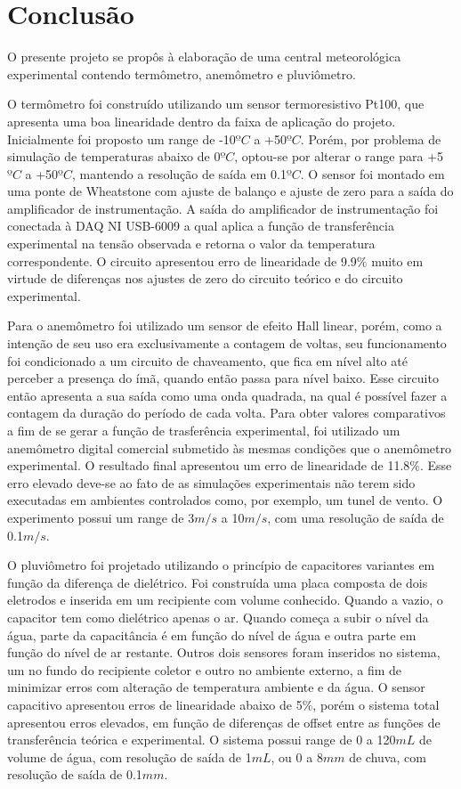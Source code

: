 \documentclass[a4paper]{instrumentacao}
\begin{document}
\chapter{Conclusão}

O presente projeto se propôs à elaboração de uma central meteorológica experimental contendo termômetro, anemômetro e pluviômetro.

O termômetro foi construído utilizando um sensor termoresistivo Pt100, que apresenta uma boa linearidade dentro da faixa de aplicação do projeto. Inicialmente foi proposto um range de -10$ºC$ a +50$ºC$. Porém, por problema de simulação de temperaturas abaixo de 0$ºC$, optou-se por alterar o range para +5$ºC$ a +50$ºC$, mantendo a resolução de saída em 0.1$ºC$. O sensor foi montado em uma ponte de Wheatstone com ajuste de balanço e ajuste de zero para a saída do amplificador de instrumentação. A saída do amplificador de instrumentação foi conectada à DAQ NI USB-6009 a qual aplica a função de transferência experimental na tensão observada e retorna o valor da temperatura correspondente. O circuito apresentou erro de linearidade de 9.9$\%$ muito em virtude de diferenças nos ajustes de zero do circuito teórico e do circuito experimental.

Para o anemômetro foi utilizado um sensor de efeito Hall linear, porém, como a intenção de seu uso era exclusivamente a contagem de voltas, seu funcionamento foi condicionado a um circuito de chaveamento, que fica em nível alto até perceber a presença do ímã, quando então passa para nível baixo. Esse circuito então apresenta a sua saída como uma onda quadrada, na qual é possível fazer a contagem da duração do período de cada volta. Para obter valores comparativos a fim de se gerar a função de trasferência experimental, foi utilizado um anemômetro digital comercial submetido às mesmas condições que o anemômetro experimental. O resultado final apresentou um erro de linearidade de 11.8$\%$. Esse erro elevado deve-se ao fato de as simulações experimentais não terem sido executadas em ambientes controlados como, por exemplo, um tunel de vento. O experimento possui um range de 3$m/s$ a 10$m/s$, com uma resolução de saída de 0.1$m/s$.

O pluviômetro foi projetado utilizando o princípio de capacitores variantes em função da diferença de dielétrico. Foi construída uma placa composta de dois eletrodos e inserida em um recipiente com volume conhecido. Quando a vazio, o capacitor tem como dielétrico apenas o ar. Quando começa a subir o nível da água, parte da capacitância é em função do nível de água e outra parte em função do nível de ar restante. Outros dois sensores foram inseridos no sistema, um no fundo do recipiente coletor e outro no ambiente externo, a fim de minimizar erros com alteração de temperatura ambiente e da água. O sensor capacitivo apresentou erros de linearidade abaixo de 5$\%$, porém o sistema total apresentou erros elevados, em função de diferenças de offset entre as funções de transferência teórica e experimental. O sistema possui range de 0 a 120$mL$ de volume de água, com resolução de saída de 1$mL$, ou 0 a 8$mm$ de chuva, com resolução de saída de 0.1$mm$.
\end{document}
